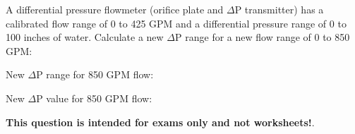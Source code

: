 

A differential pressure flowmeter (orifice plate and $\Delta$P transmitter) has a calibrated flow range of 0 to 425 GPM and a differential pressure range of 0 to 100 inches of water.  Calculate a new $\Delta$P range for a new flow range of 0 to 850 GPM:

\vskip 10pt

New $\Delta$P range for 850 GPM flow: \underbar{\hskip 50pt}







New $\Delta$P value for 850 GPM flow: 







{\bf This question is intended for exams only and not worksheets!}.



